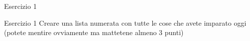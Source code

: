 \begin{frame}{Esercizio 1}

\begin{block}{Esercizio 1}
Creare una lista numerata con tutte le cose che avete imparato oggi (potete
mentire ovviamente ma mattetene almeno 3 punti)
\end{block}

\end{frame}